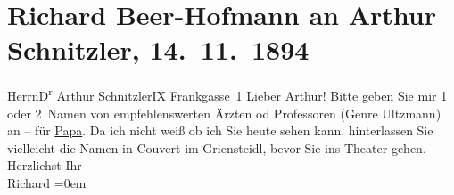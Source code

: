 

         
         \renewcommand{\erwaehntePersonen}{Personen: Alois Hofmann, Robert Ultzmann}
         \renewcommand{\erwaehnteOrte}{Orte: Café Griensteidl, Frankgasse, I., Innere Stadt, IX., Alsergrund, Wien}
         \renewcommand{\erwaehnteWerke}{}
               \section[Richard Beer-Hofmann an Arthur Schnitzler, 14. 11. 1894]{ Richard Beer-Hofmann an Arthur Schnitzler, 14. 11. 1894}\nopagebreak{}\rehead{ }\begin{ledgroupsized}[t]{13cm}\normalsize\beginnumbering \toendnotes[C]{\smallbreak\pagebreak[2]} 
\toendnotes[C]{\smallbreak}\pstart{}{\pb}Herrn\pend{}\pstart{}D\textsuperscript{r} Arthur Schnitzler\pend{}\pstart{}IX Frankgasse 1\pend{}{\bigskip}\pstart
           \noindent{}{\pb}Lieber Arthur! Bitte geben Sie mir 1 oder 2 Namen von
               empfehlenswerten Ärzten od Professoren (Genre Ultzmann) an – für \uline{Papa}. Da ich nicht weiß ob ich Sie heute sehen kann,
               hinterlassen Sie vielleicht die Namen in Couvert im Griensteidl, bevor Sie ins Theater gehen. Herzlichst\pend
           \pstart
           Ihr{\\[\baselineskip]}\spacefill\mbox{Richard}\pend
           \leftskip=0em{}
         
         \endnumbering{}\end{ledgroupsized}  \newcommand{\dateiname}{L00402}\newcommand{\titel}{Richard Beer-Hofmann an Arthur Schnitzler, 14. 11. 1894}\newcommand{\editorInnen}{Martin Anton Müller und Gerd-Hermann Susen}
      